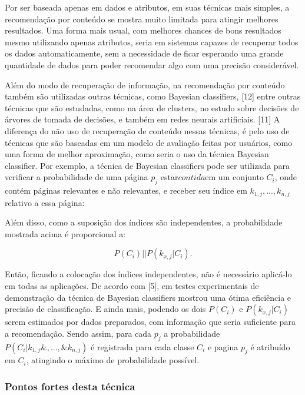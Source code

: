 \documentclass[12pt,
				openright,
				twoside,
				a4paper,
				apter=TITLE,
				section=TITLE,
				subsection=TITLE,
				chapter=TITLE,
				english,
				brazil]{abntex2}
\begin{document}
Por ser baseada apenas em dados e atributos, em suas técnicas mais simples, a recomendação por conteúdo se mostra muito limitada para atingir melhores resultados. Uma forma mais usual, com melhores chances de bons resultados mesmo utilizando apenas atributos, seria em sistemas capazes de recuperar todos os dados automaticamente, sem a necessidade de ficar esperando uma grande quantidade de dados para poder recomendar algo com uma precisão considerável. 

Além do modo de recuperação de informação, na recomendação por conteúdo também são utilizadas outras técnicas, como Bayesian classifiers, [12] entre outras técnicas que são estudadas, como na área de clusters, no estudo sobre decisões de árvores de tomada de decisões, e também em redes neurais artificiais. [11] A diferença do não uso de recuperação de conteúdo nessas técnicas, é pelo uso de técnicas que são baseadas em um modelo de avaliação feitas por usuários, como uma forma de melhor aproximação, como seria o uso da técnica Bayesian classifier. Por exemplo, a técnica de Bayesian classifiers pode ser utilizada para verificar a probabilidade de uma página $p_j$ estar$ contida $em um conjunto $C_i$, onde contém páginas relevantes e não relevantes, e receber seu índice em $k_{1,j},...,k_{n,j}$ relativo a essa página:



Além disso, como a suposição dos índices são independentes, a probabilidade mostrada acima é 
proporcional a:

\begin{equation}
P(C_i)||P(k_{x,j}|C_i).
\end{equation}

Então, ficando a colocação dos índices independentes, não é necessário aplicá-lo em todas as aplicações. De acordo com [5], em testes experimentais de demonstração da técnica de Bayesian classifiers mostrou uma ótima eficiência e precisão de classificação. E ainda mais, podendo os dois $P(C_i)$ e $P(k_{x,j}|C_i)$ serem estimados por dados preparados, com informação que seria suficiente para a recomendação. Sendo assim, para cada $p_j$ a probabilidade $P(C_i| k_{1,j}\&,...,\&k_{n,j})$ é registrada para cada classe $C_i$ e pagina $p_j$ é atribuído em $C_i$, atingindo o máximo de probabilidade possível.

\subsubsection{Pontos fortes desta técnica}
\end{document}
